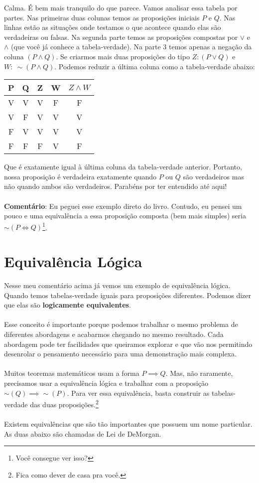 \documentclass[a4paper,11pt,oneside]{book}
\theoremstyle{definition}
\theoremstyle{break}
\begin{document}
Calma. É bem mais tranquilo do que parece. Vamos analisar essa tabela por partes. Nas primeiras duas colunas temos as proposições iniciais $P$ e $Q$. Nas linhas estão as situações onde testamos o que acontece quando elas são verdadeiras ou falsas. Na segunda parte temos as proposições compostas por $\lor$ e $\land$ (que você já conhece a tabela-verdade). Na parte 3 temos apenas a negação da coluna $(P \land Q)$. Se criarmos mais duas proposições do tipo $Z : (P \lor Q)$ e $W : \  \sim(P \land Q)$. Podemos reduzir a última coluna como a tabela-verdade abaixo:

\begin{center}
\begin{tabular}{ | c c || c c || c | }
\hline
 P & Q & Z & W & $Z \land W$ \\ 
 \hline
 V & V & V & F & F \\  
 V & F & V & V & V \\  
 F & V & V & V & V \\  
 F & F & F & V & F \\
 \hline
\end{tabular}
\end{center}

Que é exatamente igual à última coluna da tabela-verdade anterior. Portanto, nossa proposição é verdadeira exatamente quando $P$ ou $Q$ são verdadeiros mas não quando ambos são verdadeiros. Parabéns por ter entendido até aqui!
\\
\\
\textbf{Comentário}: Eu peguei esse exemplo direto do livro. Contudo, eu pensei um pouco e uma equivalência a essa proposição composta (bem mais simples) seria $\sim(P \iff Q)$\footnote{Você consegue ver isso?}.

\section{Equivalência Lógica}

Nesse meu comentário acima já vemos um exemplo de equivalência lógica. Quando temos tabelas-verdade iguais para proposições diferentes. Podemos dizer que elas são \textbf{logicamente equivalentes}.
\\
\\
Esse conceito é importante porque podemos trabalhar o mesmo problema de diferentes abordagens e acabarmos chegando no mesmo resultado. Cada abordagem pode ter facilidades que queiramos explorar e que vão nos permitindo desenrolar o pensamento necessário para uma demonstração mais complexa.
\\
\\
Muitos teoremas matemáticos usam a forma $P \implies Q$. Mas, não raramente, precisamos usar a equivalência lógica e trabalhar com a proposição $\sim (Q) \implies \sim (P)$. Para ver essa equivalência, basta construir as tabelas-verdade das duas proposições.\footnote{Fica como dever de casa pra você.}
\\
\\
Existem equivalências que são tão importantes que possuem um nome particular. As duas abaixo são chamadas de Lei de DeMorgan.
\end{document}
